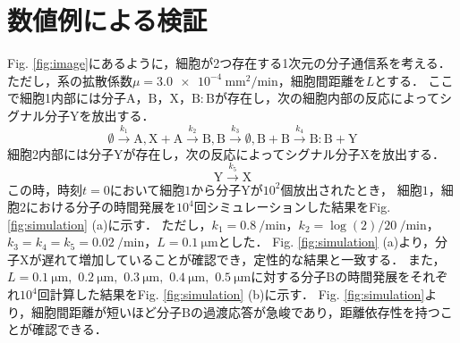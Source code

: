 \documentclass[twocolumn]{jarticle}
\begin{document}
\section{数値例による検証}
Fig. \ref{fig:image}にあるように，細胞が2つ存在する1次元の分子通信系を考える．ただし，系の拡散係数$\mu=$$\SI{3.0e-4}{\milli\meter\squared\per\minute}$，細胞間距離を$L$とする．
ここで細胞1内部には分子$\mathrm{A}$，$\mathrm{B}$，$\mathrm{X}$，$\mathrm{B:B}$が存在し，次の細胞内部の反応によってシグナル分子$\mathrm{Y}$を放出する．
\begin{equation}
    \emptyset \xrightarrow{k_1} \mathrm{A},\mathrm{X}+\mathrm{A} \xrightarrow{k_2} \mathrm{B}, \mathrm{B} \xrightarrow{k_3} \emptyset, \mathrm{B}+\mathrm{B}\xrightarrow{k_4} \mathrm{B:B} +\mathrm{Y}
\end{equation}
細胞2内部には分子$\mathrm{Y}$が存在し，次の反応によってシグナル分子$\mathrm{X}$を放出する．
\begin{equation}
    \mathrm{Y} \xrightarrow{k_5} \mathrm{X}
\end{equation}
この時，時刻$t=0$において細胞$1$から分子$\mathrm{Y}$が$10^2$個放出されたとき，
細胞$1$，細胞$2$における分子の時間発展を$10^4$回シミュレーションした結果をFig. \ref{fig:simulation} (a)に示す．
ただし，$k_1 = \SI{0.8}{\per\minute}$，$k_2 = \log(2)/20\ \si{\per\minute}$，$k_3=k_4=k_5=\SI{0.02}{\per\minute}$，$L=\SI{0.1}{\micro\meter}$とした．
Fig. \ref{fig:simulation} (a)より，分子$\mathrm{X}$が遅れて増加していることが確認でき，定性的な結果と一致する．
また，$L=\SI{0.1}{\um},$ $\SI{0.2}{\um},$ $\SI{0.3}{\um},$ $\SI{0.4}{\um},$ $\SI{0.5}{\um}$に対する分子$\mathrm{B}$の時間発展をそれぞれ$10^4$回計算した結果をFig. \ref{fig:simulation} (b)に示す．
Fig. \ref{fig:simulation}より，細胞間距離が短いほど分子$\mathrm{B}$の過渡応答が急峻であり，距離依存性を持つことが確認できる．
\end{document}
